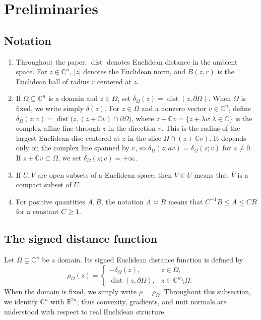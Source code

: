 \documentclass[11pt]{article}
\theoremstyle{definition}
\newcommand{\C}{\mathbb{C}}
\newcommand{\R}{\mathbb{R}}
\newcommand{\dist}{\operatorname{dist}}
\begin{document}
\section{Preliminaries}\label{sec:preliminaries}


\subsection{Notation}

\begin{enumerate}[label=(\arabic*),leftmargin=2.4em]
\item Throughout the paper, \(\dist\) denotes Euclidean distance in the ambient space. For \(z\in\C^n\), \(|z|\) denotes the Euclidean norm, and \(B(z,r)\) is the Euclidean ball of radius \(r\) centered at \(z\).

\item If \(\Omega\subsetneq\C^n\) is a domain and \(z\in\Omega\), set
\(\delta_\Omega(z)=\dist(z,\partial\Omega)\).
When \(\Omega\) is fixed, we write simply \(\delta(z)\). For
\(z\in\Omega\) and a nonzero vector \(v\in\C^n\), define
\(\delta_\Omega(z;v)=
\dist\bigl(z,(z+\C v)\cap\partial\Omega\bigr)\), where
\(z+\C v=\{z+\lambda v:\lambda\in\C\}\) is the complex affine line
through \(z\) in the direction \(v\).
This is the radius of the largest Euclidean disc centered at \(z\) in the
slice \(\Omega\cap(z+\C v)\).  It depends only on the complex line spanned by
\(v\), so \(\delta_\Omega(z;av)=\delta_\Omega(z;v)\) for \(a\ne0\).  If
\(z+\C v\subset\Omega\), we set \(\delta_\Omega(z;v)=+\infty\).

\item If \(U,V\) are open subsets of a Euclidean space, then
\(V\Subset U\) means that \(\overline V\) is a compact subset of \(U\).

\item For positive quantities \(A,B\), the notation \(A\asymp B\) means
that \(C^{-1}B\le A\le CB\) for a constant \(C\ge1\).

\end{enumerate}
\subsection{The signed distance function}
\label{subsec:signed-distance}

Let \(\Omega\subsetneq\C^n\) be a domain.  Its signed Euclidean
distance function is defined by
\[
 \rho_\Omega(z)=
 \begin{cases}
  -\delta_\Omega(z),& z\in\Omega,\\
  \dist(z,\partial\Omega),& z\in\C^n\setminus\Omega.
 \end{cases}
\]
When the domain is fixed, we simply write \(\rho=\rho_\Omega\).
Throughout this subsection, we identify \(\C^n\) with
\(\R^{2n}\); thus convexity, gradients, and unit normals are
understood with respect to real Euclidean structure.
\end{document}
